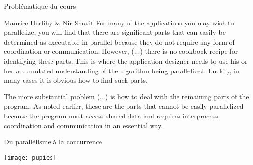\mode*

\begin{frame}{Problématique du cours}
    \begin{shadequote}{Maurice Herlihy \& Nir Shavit}
    For many of the applications you may wish to parallelize, you will find that there are significant parts that can easily be determined
    as executable in parallel because they do not require any form of coordination or communication. However, (...)
    \alert{there is no cookbook recipe for identifying these parts}. This is where the application designer needs to use
    his or her accumulated understanding of the algorithm being parallelized. Luckily, in many cases it is obvious how to find such parts.
    
    \vspace{4mm}
    \alert{The more substantial problem} (...)
    \alert{is how to deal with the remaining parts of the program.} As noted earlier, these are the parts that cannot be easily parallelized
    because the program must access shared data and requires interprocess coordination and communication in an essential way.
    \end{shadequote}
\end{frame}

\begin{frame}{Du parallélisme à la concurrence}
\begin{center}
\texttt{[image: pupies]}
\end{center}
\end{frame}



